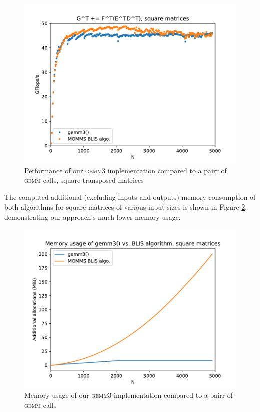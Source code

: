 \documentclass[12pt]{article}
\newcommand*{\gemmt}{{\textsc{gemm3}}}
\newcommand*{\gemm}{{\textsc{gemm}}}
\begin{document}
\begin{figure}
  \centering
  \includegraphics[height=0.40\textheight]{../results/earwig2/gemm3_ab_bc_kernel}
  \caption{Performance of our \gemmt{} implementation compared to a pairr of \gemm{} calls, square transposed matrices}
  \label{fig:ab_square}
\end{figure}

The computed additional (excluding inputs and outputs) memory consumption of both algorithms for square matrices of various input sizes is shown in Figure \ref{fig:bc_square_mem}, demonstrating our approach's much lower memory usage.
\begin{figure}
  \centering
  \includegraphics[height=0.40\textheight]{../results/earwig2/gemm3_memory}
  \caption{Memory usage of our \gemmt{} implementation compared to a pairr of \gemm{} calls}
  \label{fig:bc_square_mem}
\end{figure}
\end{document}
